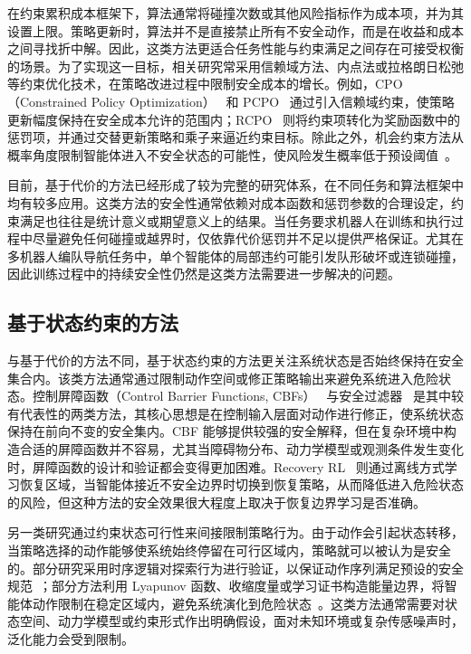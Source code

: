 在约束累积成本框架下，算法通常将碰撞次数或其他风险指标作为成本项，并为其设置上限。策略更新时，算法并不是直接禁止所有不安全动作，而是在收益和成本之间寻找折中解。因此，这类方法更适合任务性能与约束满足之间存在可接受权衡的场景。为了实现这一目标，相关研究常采用信赖域方法、内点法或拉格朗日松弛等约束优化技术，在策略改进过程中限制安全成本的增长。例如，CPO（Constrained Policy Optimization）~\cite{achiam2017constrained} 和 PCPO~\cite{yang2020projection} 通过引入信赖域约束，使策略更新幅度保持在安全成本允许的范围内；RCPO~\cite{tessler2018reward} 则将约束项转化为奖励函数中的惩罚项，并通过交替更新策略和乘子来逼近约束目标。除此之外，机会约束方法从概率角度限制智能体进入不安全状态的可能性，使风险发生概率低于预设阈值~\cite{wang2023enforcing, chen2024probabilistic}。

目前，基于代价的方法已经形成了较为完整的研究体系，在不同任务和算法框架中均有较多应用。这类方法的安全性通常依赖对成本函数和惩罚参数的合理设定，约束满足也往往是统计意义或期望意义上的结果。当任务要求机器人在训练和执行过程中尽量避免任何碰撞或越界时，仅依靠代价惩罚并不足以提供严格保证。尤其在多机器人编队导航任务中，单个智能体的局部违约可能引发队形破坏或连锁碰撞，因此训练过程中的持续安全性仍然是这类方法需要进一步解决的问题。

\subsection{基于状态约束的方法}

与基于代价的方法不同，基于状态约束的方法更关注系统状态是否始终保持在安全集合内。该类方法通常通过限制动作空间或修正策略输出来避免系统进入危险状态。控制屏障函数（Control Barrier Functions, CBFs）~\cite{ames2017cbf_qp,dawson2023safe_cbf,emam2025safe_cbf_rl,cheng2019end_to_end_cbf,cohen2023safe_exploration_cbf} 与安全过滤器~\cite{wabersich2021predictive_safety_filter,hsu2024safety_filter} 是其中较有代表性的两类方法，其核心思想是在控制输入层面对动作进行修正，使系统状态保持在前向不变的安全集内。CBF 能够提供较强的安全解释，但在复杂环境中构造合适的屏障函数并不容易，尤其当障碍物分布、动力学模型或观测条件发生变化时，屏障函数的设计和验证都会变得更加困难。Recovery RL~\cite{thananjeyan2021recovery} 则通过离线方式学习恢复区域，当智能体接近不安全边界时切换到恢复策略，从而降低进入危险状态的风险，但这种方法的安全效果很大程度上取决于恢复边界学习是否准确。

另一类研究通过约束状态可行性来间接限制策略行为。由于动作会引起状态转移，当策略选择的动作能够使系统始终停留在可行区域内，策略就可以被认为是安全的。部分研究采用时序逻辑对探索行为进行验证，以保证动作序列满足预设的安全规范~\cite{li2019temporal}；部分方法利用 Lyapunov 函数、收缩度量或学习证书构造能量边界，将智能体动作限制在稳定区域内，避免系统演化到危险状态~\cite{chow2018lyapunov,chow2019lyapunov,koller2018learning,sun2021learning_certified_control}。这类方法通常需要对状态空间、动力学模型或约束形式作出明确假设，面对未知环境或复杂传感噪声时，泛化能力会受到限制。

